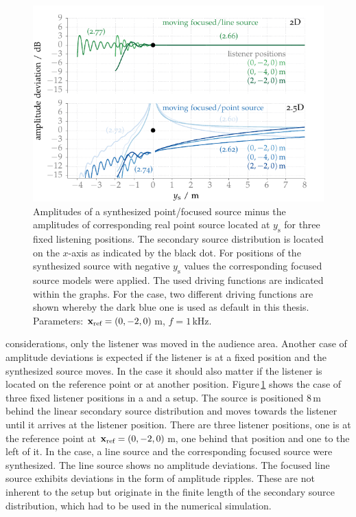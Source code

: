 %
\begin{figure}
    \centering
    \includegraphics{fig3_02/fig3_02}
    \caption{Amplitudes of a synthesized point/focused source minus the
    amplitudes of corresponding real point source located at $y_\text{s}$
    for three fixed listening positions.
    The secondary source distribution is located on the $x$-axis as
    indicated by the black dot. For positions of the synthesized source with
    negative $y_\text{s}$ values the corresponding focused source models were
    applied. The used driving functions are indicated within the graphs. For the
    \twohalfD case, two different driving functions are shown whereby the dark
    blue one is used as default in this thesis.
    Parameters: $\mathbf{x}_\text{ref} = (0,-2,0)$\,m,
    $f=1$\,kHz.
    }
    \label{fig:amplitudes_moving_source}
    \vspace{-0.7cm}
\end{figure}
%
 considerations,
only the listener was moved in the audience area. Another case of
amplitude deviations is expected if the listener is at a fixed position and the
synthesized source moves. In the \twohalfD case it should also matter if the listener is
located on the reference point or at another position.
Figure\,\ref{fig:amplitudes_moving_source} shows the case of three fixed
listener positions in a \twoD and a \twohalfD setup. The source is positioned
$8$\,m behind the linear secondary source distribution and moves
towards the listener until it arrives at the listener position.
There are three listener positions, one is at the reference point at $\mathbf{x}_\text{ref} = (0,-2,0)$\,m,
one behind that position and one to the left of it. In the \twoD case, a line source
and the corresponding focused source were synthesized. The line source shows no
amplitude deviations. The focused line source
exhibits deviations in  the form of amplitude ripples. These are not inherent to
the \twoD setup but originate in the finite length of the secondary source
distribution,
which had to be used in the numerical simulation.

